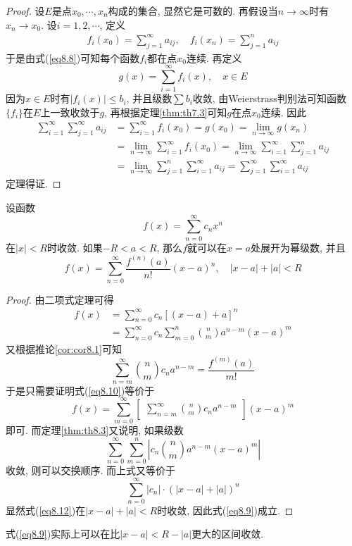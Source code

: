 \documentclass[cn,12pt,math=mtpro2,citestyle=gb7714-2015,bibstyle=gb7714-2015,twocol]{elegantbook}
\newcommand{\limn }{\lim_{n\to\infty}}
\begin{document}
\begin{proof}
  设$E$是点$x_0,\cdots,x_n$构成的集合, 显然它是可数的. 再假设当$n\to\infty$时有$x_n\to x_0$. 设$i=1,2,\cdots$, 定义
  \begin{align*}
  f_i(x_0)=\sum_{j=1}^{\infty}a_{ij},\quad f_i(x_n)=\sum_{j=1}^{n}a_{ij}
  \end{align*}
  于是由式(\ref{eq8.8})可知每个函数$f_i$都在点$x_0$连续. 再定义
  $$g(x)=\sum_{i=1}^{\infty}f_i(x),\quad x\in E$$
  因为$x\in E$时有$|f_i(x)|\leq b_i$, 并且级数$\sum b_i$收敛, 由Weierstrass判别法可知函数$\{f_i\}$在$E$上一致收敛于$g$, 再根据定理\ref{thm:th7.3}可知$g$在点$x_0$连续. 因此
  \begin{align*}
  \sum_{i=1}^{\infty}\sum_{j=1}^{\infty}a_{ij}&=\sum_{i=1}^{\infty}f_i(x_0)=g(x_0)=\limn g(x_n) \\
  &=\limn \sum_{i=1}^{\infty}f_i(x_0)=\limn \sum_{i=1}^{\infty}\sum_{j=1}^{n}a_{ij} \\
  &=\limn \sum_{j=1}^{n}\sum_{i=1}^{\infty}a_{ij}=\sum_{j=1}^{\infty}\sum_{i=1}^{\infty}a_{ij}
  \end{align*}
  定理得证.

\end{proof}
\begin{theorem}\label{thm:th8.4}
  设函数
  $$f(x)=\sum_{n=0}^{\infty}c_nx^n$$
  在$|x|<R$时收敛. 如果$-R<a<R$, 那么$f$就可以在$x=a$处展开为幂级数, 并且
  \begin{equation}\label{eq8.9}
    f(x)=\sum_{n=0}^{\infty}\frac{f^{(n)}(a)}{n!}(x-a)^n, \quad |x-a|+|a|<R
  \end{equation}
\end{theorem}
\begin{proof}
  由二项式定理可得
  \begin{align}\label{eq8.10}
  f(x)&=\sum_{n=0}^{\infty}c_n[(x-a)+a]^n \nonumber \\
  &=\sum_{n=0}^{\infty}c_n\sum_{m=0}^{n}\binom{n}{m}a^{n-m}(x-a)^m
  \end{align}
  又根据推论\ref{cor:cor8.1}可知
  $$\sum_{n=m}^{\infty}\binom{n}{m}c_na^{n-m}=\frac{f^{(m)}(a)}{m!}$$
  于是只需要证明式(\ref{eq8.10})等价于
  $$f(x)=\sum_{m=0}^{\infty}\begin{bmatrix}
                              \displaystyle \sum_{n=m}^{\infty}\binom{n}{m}c_na^{n-m}
                            \end{bmatrix}(x-a)^m$$
  即可. 而定理\ref{thm:th8.3}又说明, 如果级数
  \begin{equation}\label{eq8.11}
    \sum_{n=0}^{\infty}\sum_{m=0}^{n}\left|c_n\binom{n}{m}a^{n-m}(x-a)^m\right|
  \end{equation}
  收敛, 则可以交换顺序. 而上式又等价于
  \begin{equation}\label{eq8.12}
    \sum_{n=0}^{\infty}|c_n|\cdot(|x-a|+|a|)^n
  \end{equation}
  显然式(\ref{eq8.12})在$|x-a|+|a|<R$时收敛, 因此式(\ref{eq8.9})成立.

\end{proof}
\begin{remark}
式(\ref{eq8.9})实际上可以在比$|x-a|<R-|a|$更大的区间收敛.
\end{remark}
\end{document}
